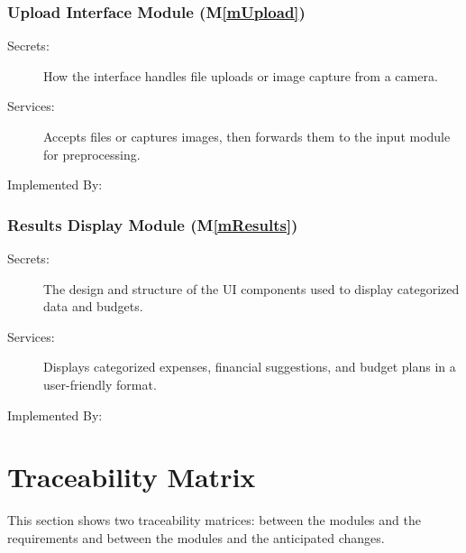 \documentclass[12pt, titlepage]{article}
\newcommand{\mref}[1]{M\ref{#1}}
\begin{document}
\subsubsection{Upload Interface Module (\mref{mUpload})}

\begin{description}
\item[Secrets:] How the interface handles file uploads or image capture from a camera.
\item[Services:] Accepts files or captures images, then forwards them to the input module for preprocessing.
\item[Implemented By:] \progname
\end{description}

\subsubsection{Results Display Module (\mref{mResults})}

\begin{description}
\item[Secrets:] The design and structure of the UI components used to display categorized data and budgets.
\item[Services:] Displays categorized expenses, financial suggestions, and budget plans in a user-friendly format.
\item[Implemented By:] \progname
\end{description}

\section{Traceability Matrix} \label{SecTM}

This section shows two traceability matrices: between the modules and the
requirements and between the modules and the anticipated changes.
\end{document}
